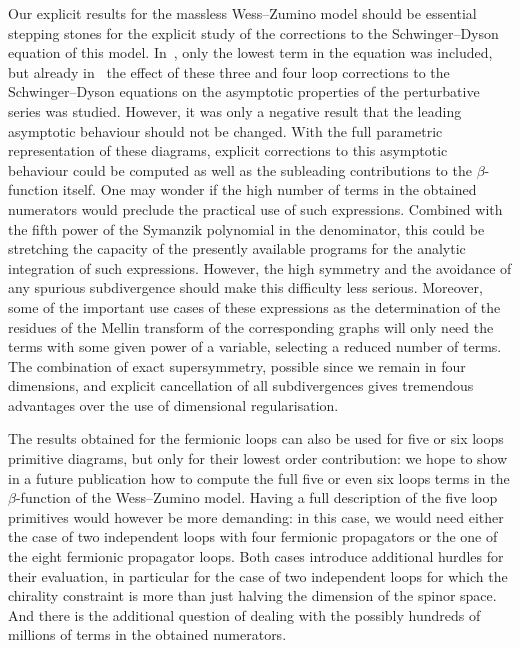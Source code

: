 \documentclass[pdftex]{sigma}
\numberwithin{equation}{section}
\begin{document}
Our explicit results for the
massless Wess--Zumino model should be essential stepping stones for the explicit study of the corrections to the
Schwinger--Dyson equation of this model. In~\cite{BeSc08}, only the lowest term in the equation was included, but already
in~\cite{BeSc12} the effect of these three and four loop corrections to the Schwinger--Dyson equations on the asymptotic
properties of the perturbative series was studied. However, it was only a negative result that the leading asymptotic
behaviour should not be changed. With the full parametric representation of these diagrams, explicit corrections to this
asymptotic behaviour could be computed as well as the subleading contributions to the $\beta$-function itself.
One may wonder if the high number of terms in the obtained numerators would preclude the practical
use of such expressions. Combined with the fifth power of the Symanzik polynomial in the denominator, this could be
stretching the capacity of the presently available programs for the analytic integration of such expressions. However, the
high symmetry and the avoidance of any spurious subdivergence should make this difficulty less serious. Moreover, some of
the important use cases of these expressions as the determination of the residues of the Mellin transform of the
corresponding graphs will only need the terms with some given power of a variable, selecting a reduced number of
terms. The combination of exact supersymmetry, possible since we remain in four dimensions, and explicit cancellation of
all subdivergences gives tremendous advantages over the use of dimensional regularisation.

The results obtained for the fermionic loops can also be used for five or six loops primitive diagrams, but only for their lowest
order contribution: we hope to show in a future publication how to compute the full five or even six loops terms in the
$\beta$-function of the Wess--Zumino model. Having a full description of the five loop primitives would however be more
demanding: in this case, we would need either the case of two independent loops with four fermionic propagators or the one
of the eight fermionic propagator loops. Both cases introduce additional hurdles for their evaluation, in particular for
the case of two independent loops for which the chirality constraint is more than just halving the dimension of the spinor
space. And there is the additional question of dealing with the possibly hundreds of millions of terms in the obtained
numerators.
\end{document}
